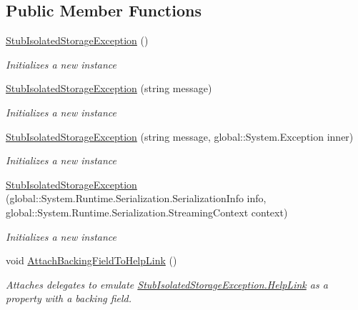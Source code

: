 \subsection*{Public Member Functions}
\begin{DoxyCompactItemize}
\item 
\hyperlink{class_system_1_1_i_o_1_1_isolated_storage_1_1_fakes_1_1_stub_isolated_storage_exception_a1203454bb8e04ce86c02ca38222cdac5}{Stub\-Isolated\-Storage\-Exception} ()
\begin{DoxyCompactList}\small\item\em Initializes a new instance\end{DoxyCompactList}\item 
\hyperlink{class_system_1_1_i_o_1_1_isolated_storage_1_1_fakes_1_1_stub_isolated_storage_exception_a1c80339d18b4bcb91109628dd6edf03a}{Stub\-Isolated\-Storage\-Exception} (string message)
\begin{DoxyCompactList}\small\item\em Initializes a new instance\end{DoxyCompactList}\item 
\hyperlink{class_system_1_1_i_o_1_1_isolated_storage_1_1_fakes_1_1_stub_isolated_storage_exception_a9a3802036bcad833a8251471bf1a3360}{Stub\-Isolated\-Storage\-Exception} (string message, global\-::\-System.\-Exception inner)
\begin{DoxyCompactList}\small\item\em Initializes a new instance\end{DoxyCompactList}\item 
\hyperlink{class_system_1_1_i_o_1_1_isolated_storage_1_1_fakes_1_1_stub_isolated_storage_exception_a2e0062fa954dfee9b5d95a2584968760}{Stub\-Isolated\-Storage\-Exception} (global\-::\-System.\-Runtime.\-Serialization.\-Serialization\-Info info, global\-::\-System.\-Runtime.\-Serialization.\-Streaming\-Context context)
\begin{DoxyCompactList}\small\item\em Initializes a new instance\end{DoxyCompactList}\item 
void \hyperlink{class_system_1_1_i_o_1_1_isolated_storage_1_1_fakes_1_1_stub_isolated_storage_exception_aa9f3075a8ab02d81a7a55d9fb023af7e}{Attach\-Backing\-Field\-To\-Help\-Link} ()
\begin{DoxyCompactList}\small\item\em Attaches delegates to emulate \hyperlink{class_system_1_1_i_o_1_1_isolated_storage_1_1_fakes_1_1_stub_isolated_storage_exception_ac5bd93f0f153e5149fb99e972725bcf2}{Stub\-Isolated\-Storage\-Exception.\-Help\-Link} as a property with a backing field.\end{DoxyCompactList}\item 

\end{DoxyCompactItemize}

